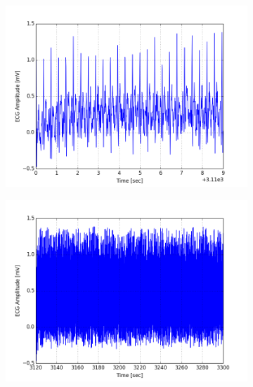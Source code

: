 \documentclass[paper=a4, fontsize=11pt]{scrartcl}
\numberwithin{equation}{section}		%
\numberwithin{figure}{section}			%
\numberwithin{table}{section}		    %
\begin{document}
\begin{appendices}
\begin{figure}[H]
	\centering
	\begin{subfigure}[b]{0.3\textwidth}
		\includegraphics[width=\textwidth]{sim/ecg_64}
	\end{subfigure}
	\begin{subfigure}[b]{0.3\textwidth}
		\includegraphics[width=\textwidth]{sim/ecg_65}
	\end{subfigure}
	\begin{subfigure}[b]{0.3\textwidth}

\end{subfigure}
\end{figure}
\end{appendices}
\end{document}
